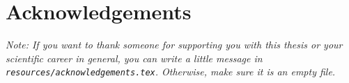 \chapter*{Acknowledgements}

\textit{Note: If you want to thank someone for supporting you with this thesis or your scientific career in general, you can write a little message in \texttt{resources/acknowledgements.tex}. Otherwise, make sure it is an empty file.}
